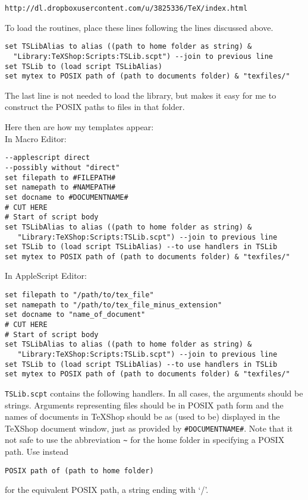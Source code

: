 \documentclass[11pt]{amsart}
\def\TeXShop{\TeX Shop\xspace}
\begin{document}
\begin{verbatim}
http://dl.dropboxusercontent.com/u/3825336/TeX/index.html
\end{verbatim}
To load the routines, place these lines following the lines discussed above.
\begin{verbatim}
set TSLibAlias to alias ((path to home folder as string) &
  "Library:TeXShop:Scripts:TSLib.scpt") --join to previous line
set TSLib to (load script TSLibAlias)
set mytex to POSIX path of (path to documents folder) & "texfiles/"
\end{verbatim}
The last line is not needed to load the library, but makes it easy for me to construct the POSIX paths to files in that folder.

Here then are how my templates appear:\\[6pt]
\textsf{In Macro Editor:}
\begin{verbatim}
--applescript direct   
--possibly without "direct"
set filepath to #FILEPATH#
set namepath to #NAMEPATH#
set docname to #DOCUMENTNAME#
# CUT HERE
# Start of script body
set TSLibAlias to alias ((path to home folder as string) &
   "Library:TeXShop:Scripts:TSLib.scpt") --join to previous line
set TSLib to (load script TSLibAlias) --to use handlers in TSLib
set mytex to POSIX path of (path to documents folder) & "texfiles/"
\end{verbatim}

\textsf{In AppleScript Editor:}
\begin{verbatim}
set filepath to "/path/to/tex_file"
set namepath to "/path/to/tex_file_minus_extension"
set docname to "name_of_document"
# CUT HERE
# Start of script body
set TSLibAlias to alias ((path to home folder as string) &
   "Library:TeXShop:Scripts:TSLib.scpt") --join to previous line
set TSLib to (load script TSLibAlias) --to use handlers in TSLib
set mytex to POSIX path of (path to documents folder) & "texfiles/"
\end{verbatim}

{\tt TSLib.scpt} contains the following handlers. In all cases, the arguments should be strings. Arguments representing files should be in POSIX path form and the names of documents in \TeXShop should be as (used to be) displayed in the \TeXShop document window, just as provided by \verb|#DOCUMENTNAME#|. Note that it not safe to use the abbreviation \verb|~| for the home folder in specifying a POSIX path. Use instead
\begin{verbatim}
POSIX path of (path to home folder)
\end{verbatim}
for the equivalent POSIX path, a string ending with `/'.
\end{document}
